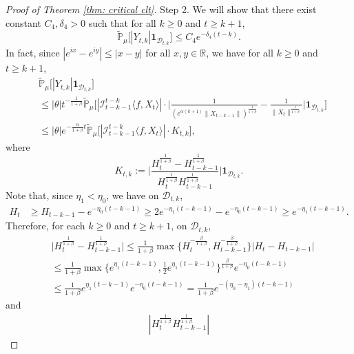 \documentclass[12pt,a4paper]{amsart}
\theoremstyle{plain}
\theoremstyle{definition}
\numberwithin{equation}{section}
\begin{document}
\begin{proof}[Proof of Theorem \ref{thm: critical clt}]
    Step 2. We will show that there exist constant $C_4,\delta_4 > 0$ such that for all $k\geq 0$ and $t\geq k+1$,
\begin{equation}
\label{thm122}
    \mathbb{\widetilde{P}}_{\mu}\big[|Y_{t,k}|\mathbf{1}_{\mathcal{D}_{t,k}}\big]
    \leq  C_4 e^{-\delta_4 (t-k)}.
\end{equation}
    In fact, since $|e^{ix}-e^{iy}|\leq|x-y|$ for all $x,y\in \mathbb R$, we have for all $k \geq 0$ and $t\geq k+1$,
\begin{align}
\label{eq: control of Ykt}
    &\mathbb{\widetilde{P}}_{\mu}\big[|Y_{t,k}|\mathbf{1}_{\mathcal{D}_{t,k}}\big]
    \\&\leq|\theta|t^{-\frac{1}{1+\beta}} \mathbb{\widetilde{P}}_{\mu}\bigg[|\mathcal I_{t-k-1}^{t-k}\langle f ,X_t\rangle|\cdot\Big|\frac{1}{(e^{\alpha(k+1)}\|X_{t-k-1}\|)^{\frac{1}{1+\beta}}}-\frac{1}{\|X_t\|^{\frac{1}{1+\beta}}}\Big|\mathbf{1}_{\mathcal{D}_{t,k}}\bigg]
    \\&\leq |\theta| e^{-\frac{\alpha}{1+\beta}t}\mathbb{\widetilde{P}}_{\mu}\big[|\mathcal I_{t-k-1}^{t-k}\langle f ,X_t\rangle|\cdot K_{t,k}\big],
\end{align}
    where
\begin{equation}
\label{def: Ktk}
    K_{t,k}
    :=\Big|\frac{H_t^{\frac{1}{1+\beta}}-H_{t-k-1}^{\frac{1}{1+\beta}}}{H_t^{\frac{1}{1+\beta}}H_{t-k-1}^{\frac{1}{1+\beta}}}\Big|\mathbf{1}_{\mathcal{D}_{t,k}}.
\end{equation}
    Note that, since $\eta_1 < \eta_0$, we have on $\mathcal D_{t,k}$,
\begin{align}
    H_t
    &\geq H_{t-k-1}- e^{-\eta_0(t-k-1)}
    \geq 2e^{-\eta_1(t-k-1)}-e^{-\eta_0(t-k-1)}
    \geq e^{-\eta_1(t-k-1)}.
\end{align}
    Therefore, for each $k \geq 0$ and $t\geq k+1$,  on $\mathcal D_{t,k}$,
\begin{align}
    &\Big|H_t^{\frac{1}{1+\beta}}-H_{t-k-1}^{\frac{1}{1+\beta}}\Big|
    \leq \frac{1}{1+\beta}\max \Big\{H_t^{-\frac{\beta}{1+\beta}},H_{t-k-1}^{-\frac{\beta}{1+\beta}}\Big\}\left|H_t-H_{t-k-1}\right|
    \\&\leq \frac{1}{1+\beta} \max\{e^{\eta_1 (t-k-1)}, \frac{1}{2}e^{\eta_1(t-k-1)}\}^{\frac{\beta}{1+\beta}}e^{-\eta_0(t-k-1)}
    \\&\leq \frac{1}{1+\beta} e^{\eta_1 (t-k-1)} e^{-\eta_0(t-k-1)}
    =\frac{1}{1+\beta}  e^{-(\eta_0 - \eta_1)(t-k-1)}
\end{align}
    and
\begin{align}
    |H_t^{\frac{1}{1+\beta}}H_{t-k-1}^{\frac{1}{1+\beta}}|

\end{align}
\end{proof}
\end{document}
